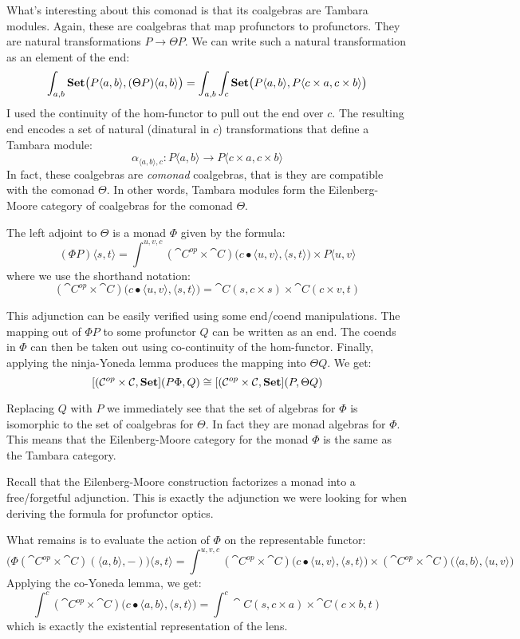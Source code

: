 \documentclass[DaoFP]{subfiles}
\begin{document}
What's interesting about this comonad is that its coalgebras are Tambara modules. Again, these are coalgebras that map profunctors to profunctors. They are natural transformations $P \to \Theta P$. We can write such a natural transformation as an element of the end:
\[\int_{a, b} \mathbf{Set} \big (P \langle a, b \rangle, (\Theta P) \langle a, b \rangle \big) = \int_{a, b} \int_c \mathbf{Set} \big( P\langle a, b \rangle , P \langle c \times a, c \times b \rangle \big) \]
I used the continuity of the hom-functor to pull out the end over $c$. The resulting end encodes a set of natural (dinatural in $c$) transformations that define a Tambara module:
\[ \alpha_{\langle a, b\rangle, c} \colon P \langle a, b \rangle \to P \langle c \times a, c \times b \rangle \]
In fact, these coalgebras are \emph{comonad} coalgebras, that is they are compatible with the comonad $\Theta$. In other words, Tambara modules form the Eilenberg-Moore category of coalgebras for the comonad $\Theta$.

The left adjoint to $\Theta$ is a monad $\Phi$ given by the formula:
\[(\Phi P)  \langle s, t \rangle = \int^{u, v, c} (\cat C^{op} \times \cat C) \big(c \bullet \langle u, v\rangle , \langle s, t \rangle\big) \times P \langle u, v \rangle \]
where we use the shorthand notation:
\[ (\cat C^{op} \times \cat C) \big(c \bullet \langle u, v\rangle , \langle s, t \rangle\big) = \cat C(s, c \times s) \times \cat C(c \times v, t) \]

This adjunction can be easily verified using some end/coend manipulations. The mapping out of $\Phi P$ to some profunctor $Q$ can be written as an end. The coends in $\Phi$ can then be taken out using co-continuity of the hom-functor. Finally, applying the ninja-Yoneda lemma produces the mapping into $\Theta Q$. We get:
\[ [(\mathcal{C}^{op} \times \mathcal{C}, \mathbf{Set}] (P \Phi, Q) \cong [(\mathcal{C}^{op} \times \mathcal{C}, \mathbf{Set}] (P, \Theta Q) \]

Replacing $Q$ with $P$ we immediately see that the set of algebras for $\Phi$ is isomorphic to the set of coalgebras for $\Theta$. In fact they are monad algebras for $\Phi$. This means that the Eilenberg-Moore category for the monad $\Phi$ is the same as the Tambara category.

Recall that the Eilenberg-Moore construction factorizes a monad into a free/forgetful adjunction. This is exactly the adjunction we were looking for when deriving the formula for profunctor optics. 

What remains is to evaluate the action of $\Phi$ on the representable functor:
\[ \big( \Phi (\cat C^{op} \times \cat C) (\langle a, b\rangle ,-) \big) \langle s, t\rangle = \int^{u, v, c} (\cat C^{op} \times \cat C) \big(c \bullet \langle u, v\rangle , \langle s, t \rangle \big) \times  (\cat C^{op} \times \cat C) \big(\langle a, b\rangle , \langle u, v\rangle \big)\]
Applying the co-Yoneda lemma, we get:
\[ \int^c (\cat C^{op} \times \cat C) \big(c \bullet \langle a, b\rangle , \langle s, t \rangle\big) = \int^c \cat C(s, c \times a) \times \cat C (c \times b, t)\]
which is exactly the existential representation of the lens.
\end{document}
